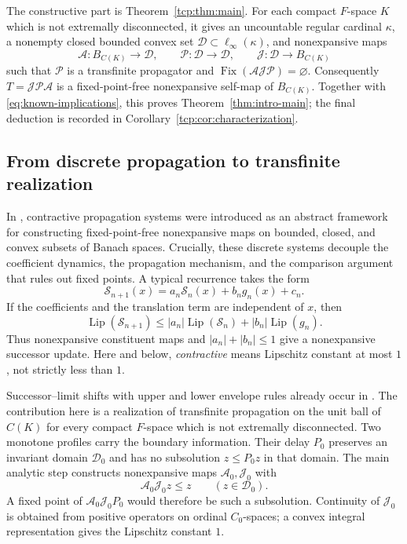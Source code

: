 \documentclass[preprint,12pt,nopreprintline]{elsarticle}
\theoremstyle{definition}
\theoremstyle{remark}
\numberwithin{equation}{section}
\begin{document}
The constructive part is Theorem~\ref{tcp:thm:main}. For each compact $F$-space $K$ which is not extremally disconnected, it gives an uncountable regular cardinal $\kappa$, a nonempty closed bounded convex set $\mathcal D\subset\ell_\infty(\kappa)$, and nonexpansive maps
\[
 \mathcal A:B_{C(K)}\to\mathcal D,\qquad
 \mathscr P:\mathcal D\to\mathcal D,\qquad
 \mathcal J:\mathcal D\to B_{C(K)}
\]
such that $\mathscr P$ is a transfinite propagator and $\operatorname{Fix}(\mathcal A\mathcal J\mathscr P)=\varnothing$.
Consequently $T=\mathcal J\mathscr P\mathcal A$ is a fixed-point-free nonexpansive self-map of $B_{C(K)}$.
Together with \eqref{eq:known-implications}, this proves Theorem~\ref{thm:intro-main}; the final deduction is recorded in
Corollary~\ref{tcp:cor:characterization}.

\subsection{From discrete propagation to transfinite realization}

In \cite{Barroso2026}, contractive propagation systems were introduced as an abstract framework for constructing fixed-point-free nonexpansive maps on bounded, closed, and convex subsets of Banach spaces. Crucially, these discrete systems decouple the coefficient dynamics, the propagation mechanism, and the comparison argument that rules out fixed points. A typical recurrence takes the form
\begin{equation}
 \mathcal S_{n+1}(x)
 =a_n\mathcal S_n(x)+b_ng_n(x)+c_n.
 \label{tcp:eq:discrete}
\end{equation}
If the coefficients and the translation term are independent of $x$, then
\[
 \operatorname{Lip}(\mathcal S_{n+1})
 \le |a_n|\operatorname{Lip}(\mathcal S_n)
      +|b_n|\operatorname{Lip}(g_n).
\]
Thus nonexpansive constituent maps and $|a_n|+|b_n|\le1$ give a nonexpansive successor update. Here and below, \emph{contractive}
means Lipschitz constant at most $1$, not strictly less than $1$.

\smallskip 

Successor--limit shifts with upper and lower envelope rules already occur in \cite[proof of Theorem~4.1]{AJLCS}. The contribution here is a realization of transfinite propagation on the unit ball of $C(K)$ for every compact $F$-space which is not extremally disconnected. Two monotone profiles carry the boundary information. Their delay $P_0$ preserves an invariant domain $\mathcal D_0$ and has no subsolution $z\le P_0z$ in that domain. The main analytic step constructs nonexpansive maps $\mathcal A_0,\mathcal J_0$ with
\[
 \mathcal A_0\mathcal J_0z\le z\qquad(z\in\mathcal D_0).
\]
A fixed point of $\mathcal A_0\mathcal J_0P_0$ would therefore be such a subsolution. Continuity of $\mathcal J_0$ is obtained from positive operators on ordinal $C_0$-spaces; a convex integral representation gives the Lipschitz constant $1$.
\end{document}
